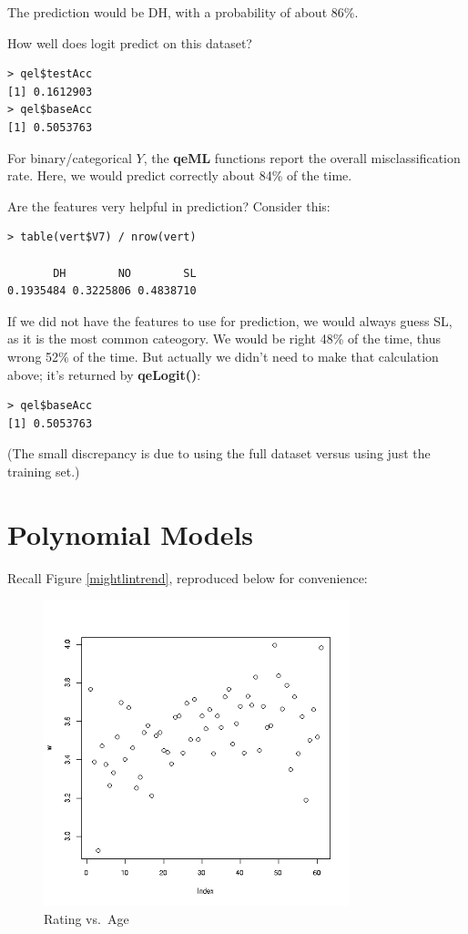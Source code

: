 The prediction would be DH, with a probability of about 86\%.

How well does logit predict on this dataset?

\begin{lstlisting}
> qel$testAcc
[1] 0.1612903
> qel$baseAcc
[1] 0.5053763
\end{lstlisting}


For binary/categorical $Y$, the \textbf{qeML} functions report the
overall misclassification rate.  Here, we would predict correctly about
84\% of the time. 

Are the features very helpful in prediction?  Consider this:

\begin{lstlisting}
> table(vert$V7) / nrow(vert)

       DH        NO        SL 
0.1935484 0.3225806 0.4838710 
\end{lstlisting}

If we did not have the features to use for prediction, we would always
guess SL, as it is the most common cateogory.  We would be right 48\% of
the time, thus wrong 52\% of the time.  But actually we didn't need to
make that calculation above; it's returned by \textbf{qeLogit()}:

\begin{lstlisting}
> qel$baseAcc
[1] 0.5053763
\end{lstlisting}

(The small discrepancy is due to using the full dataset versus using
just the training set.)

\section{Polynomial Models}

Recall Figure \ref{mightlintrend}, reproduced below for convenience:

\begin{figure}
\includegraphics[width=3.5in]{Images/MeanRatVsAge.png}
\caption{Rating vs.\ Age}
\end{figure}

